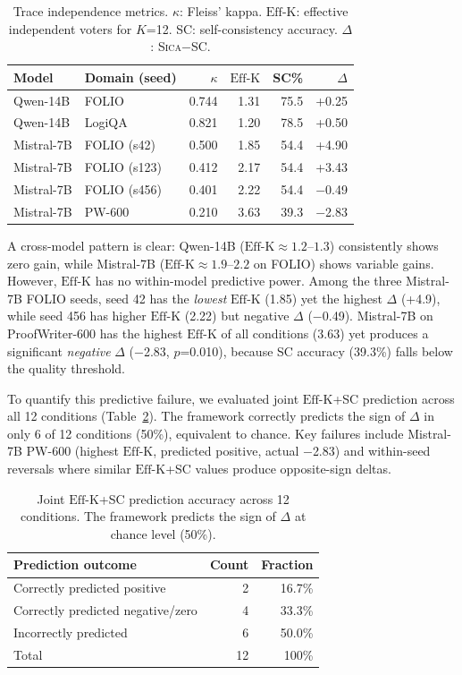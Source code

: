 \documentclass[11pt,a4paper]{article}
\newcommand{\sica}{\textsc{Sica}}
\newcommand{\effk}{\text{Eff-K}}
\newcommand{\pp}{\text{pp}}
\begin{document}
\begin{table}[t]
\centering
\caption{Trace independence metrics. $\kappa$: Fleiss' kappa. $\effk{}$: effective independent voters for $K$=12. SC: self-consistency accuracy. $\Delta$: \sica{}$-$SC.}
\label{tab:independence}
\small
\begin{tabular}{llrrrr}
\toprule
Model & Domain (seed) & $\kappa$ & $\effk{}$ & SC\% & $\Delta$\pp{} \\
\midrule
Qwen-14B & FOLIO & 0.744 & 1.31 & 75.5 & +0.25 \\
Qwen-14B & LogiQA & 0.821 & 1.20 & 78.5 & +0.50 \\
Mistral-7B & FOLIO (s42) & 0.500 & 1.85 & 54.4 & +4.90 \\
Mistral-7B & FOLIO (s123) & 0.412 & 2.17 & 54.4 & +3.43 \\
Mistral-7B & FOLIO (s456) & 0.401 & 2.22 & 54.4 & $-$0.49 \\
Mistral-7B & PW-600 & 0.210 & 3.63 & 39.3 & $-$2.83 \\
\bottomrule
\end{tabular}
\end{table}

A cross-model pattern is clear: Qwen-14B ($\effk{} \approx 1.2$--$1.3$) consistently shows zero gain, while Mistral-7B ($\effk{} \approx 1.9$--$2.2$ on FOLIO) shows variable gains.
However, $\effk{}$ has no within-model predictive power.
Among the three Mistral-7B FOLIO seeds, seed 42 has the \emph{lowest} $\effk{}$ (1.85) yet the highest $\Delta$ (+4.9\pp{}), while seed 456 has higher $\effk{}$ (2.22) but negative $\Delta$ ($-$0.49\pp{}).
Mistral-7B on ProofWriter-600 has the highest $\effk{}$ of all conditions (3.63) yet produces a significant \emph{negative} $\Delta$ ($-$2.83\pp{}, $p$=0.010), because SC accuracy (39.3\%) falls below the quality threshold.

To quantify this predictive failure, we evaluated joint $\effk{}$+SC prediction across all 12 conditions (Table~\ref{tab:prediction}).
The framework correctly predicts the sign of $\Delta$ in only 6 of 12 conditions (50\%), equivalent to chance.
Key failures include Mistral-7B PW-600 (highest $\effk{}$, predicted positive, actual $-$2.83\pp{}) and within-seed reversals where similar $\effk{}$+SC values produce opposite-sign deltas.

\begin{table}[t]
\centering
\caption{Joint $\effk{}$+SC prediction accuracy across 12 conditions. The framework predicts the sign of $\Delta$ at chance level (50\%).}
\label{tab:prediction}
\small
\begin{tabular}{lrr}
\toprule
Prediction outcome & Count & Fraction \\
\midrule
Correctly predicted positive & 2 & 16.7\% \\
Correctly predicted negative/zero & 4 & 33.3\% \\
Incorrectly predicted & 6 & 50.0\% \\
\midrule
Total & 12 & 100\% \\
\bottomrule
\end{tabular}
\end{table}
\end{document}
